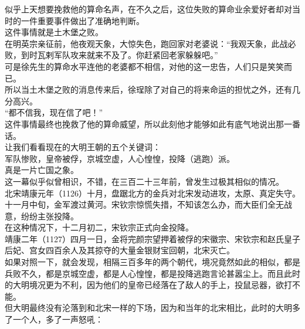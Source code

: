 \begin{multicols}{\theparacolNo}
似乎上天想要挽救他的算命名声，在不久之后，这位失败的算命业余爱好者却对当时的一件重要事件做出了准确地判断。\\

这件事情就是土木堡之败。\\

在明英宗亲征前，他夜观天象，大惊失色，跑回家对老婆说：“我观天象，此战必败，到时瓦剌军队攻来就来不及了。你赶紧回老家躲躲吧。”\\

可是徐先生的算命水平连他的老婆都不相信，对他的这一忠告，人们只是笑笑而已。\\

所以当土木堡之败的消息传来后，徐珵除了对自己的将来命运的担忧之外，还有几分高兴。\\

“都不信我，现在信了吧！”\\

这件事情最终也挽救了他的算命威望，所以此刻他才能够如此有底气地说出那一番话。\\

让我们看看现在的大明王朝的五个关键词：\\

军队惨败，皇帝被俘，京城空虚，人心惶惶，投降（逃跑）派。\\

真是一片亡国之象。\\

这一幕似乎似曾相识，不错，在三百二十三年前，曾发生过极其相似的情况。\\

北宋靖康元年（1126）十月，盘踞北方的金兵对北宋发动进攻，太原、真定失守。十一月中旬，金军渡过黄河。宋钦宗惊慌失措，不知该怎么办，而大臣们全无战意，纷纷主张投降。\\

在这种情况下，十二月初二，宋钦宗正式向金投降。\\

靖康二年（1127）四月一日，金将完颜宗望押着被俘的宋徽宗、宋钦宗和赵氏皇子后妃、宫女四百余人及其掠夺的大量金银财宝回朝，北宋灭亡。\\

如果对照一下，就会发现，相隔三百多年的两个朝代，境况竟然如此的相似，都是兵败不久，都是京城空虚，都是人心惶惶，都是投降逃跑言论甚嚣尘上。而且此时的大明境况更为不利，因为他们的皇帝已经落在了敌人的手上，投鼠忌器，欲打不能。\\

但大明最终没有沦落到和北宋一样的下场，因为和当年的北宋相比，此时的大明多了一个人，多了一声怒吼：\\


\end{multicols}

